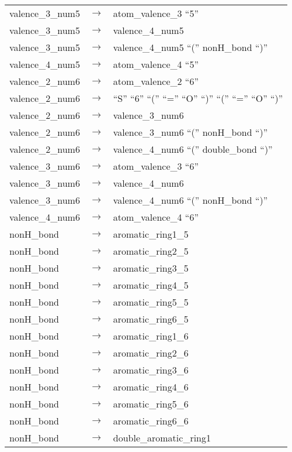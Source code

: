 \documentclass[../Document.tex]{subfiles}
\begin{document}
\begin{longtable}{m{} p{} p{}}
    valence\_3\_num5 & $\rightarrow$ & atom\_valence\_3 ``5'' \\
    valence\_3\_num5 & $\rightarrow$ & valence\_4\_num5 \\
    valence\_3\_num5 & $\rightarrow$ & valence\_4\_num5 ``('' nonH\_bond ``)'' \\
    valence\_4\_num5 & $\rightarrow$ & atom\_valence\_4 ``5'' \\
    valence\_2\_num6 & $\rightarrow$ & atom\_valence\_2 ``6'' \\
    valence\_2\_num6 & $\rightarrow$ & ``S'' ``6'' ``('' ``='' ``O'' ``)'' ``('' ``='' ``O'' ``)'' \\
    valence\_2\_num6 & $\rightarrow$ & valence\_3\_num6 \\
    valence\_2\_num6 & $\rightarrow$ & valence\_3\_num6 ``('' nonH\_bond ``)'' \\
    valence\_2\_num6 & $\rightarrow$ & valence\_4\_num6 ``('' double\_bond ``)'' \\
    valence\_3\_num6 & $\rightarrow$ & atom\_valence\_3 ``6'' \\
    valence\_3\_num6 & $\rightarrow$ & valence\_4\_num6 \\
    valence\_3\_num6 & $\rightarrow$ & valence\_4\_num6 ``('' nonH\_bond ``)'' \\
    valence\_4\_num6 & $\rightarrow$ & atom\_valence\_4 ``6'' \\
    nonH\_bond & $\rightarrow$ & aromatic\_ring1\_5 \\
    nonH\_bond & $\rightarrow$ & aromatic\_ring2\_5 \\
    nonH\_bond & $\rightarrow$ & aromatic\_ring3\_5 \\
    nonH\_bond & $\rightarrow$ & aromatic\_ring4\_5 \\
    nonH\_bond & $\rightarrow$ & aromatic\_ring5\_5 \\
    nonH\_bond & $\rightarrow$ & aromatic\_ring6\_5 \\
    nonH\_bond & $\rightarrow$ & aromatic\_ring1\_6 \\
    nonH\_bond & $\rightarrow$ & aromatic\_ring2\_6 \\
    nonH\_bond & $\rightarrow$ & aromatic\_ring3\_6 \\
    nonH\_bond & $\rightarrow$ & aromatic\_ring4\_6 \\
    nonH\_bond & $\rightarrow$ & aromatic\_ring5\_6 \\
    nonH\_bond & $\rightarrow$ & aromatic\_ring6\_6 \\
    nonH\_bond & $\rightarrow$ & double\_aromatic\_ring1 \\

\end{longtable}
\end{document}
